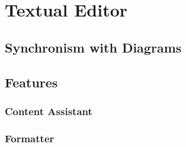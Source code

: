 \chapter{Textual Editor}

\section{Synchronism with Diagrams}
\section{Features}
\subsection{Content Assistant}
\subsection{Formatter}
